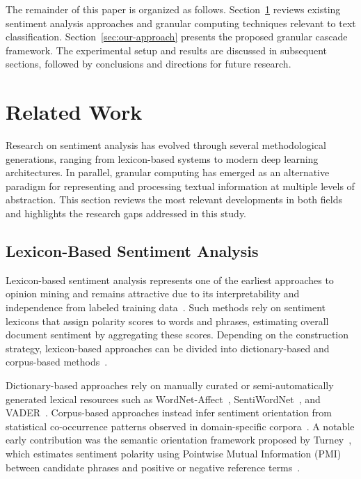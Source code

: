 \documentclass[a4paper,fleqn]{cas-dc}
\begin{document}
The remainder of this paper is organized as follows. Section~\ref{sec:related_work} reviews existing sentiment analysis approaches and granular computing techniques relevant to text classification. Section~\ref{sec:our-approach} presents the proposed granular cascade framework. The experimental setup and results are discussed in subsequent sections, followed by conclusions and directions for future research.


\section{Related Work}
\label{sec:related_work}

Research on sentiment analysis has evolved through several methodological generations, ranging from lexicon-based systems to modern deep learning architectures. In parallel, granular computing has emerged as an alternative paradigm for representing and processing textual information at multiple levels of abstraction. This section reviews the most relevant developments in both fields and highlights the research gaps addressed in this study.

\subsection{Lexicon-Based Sentiment Analysis}

Lexicon-based sentiment analysis represents one of the earliest approaches to opinion mining and remains attractive due to its interpretability and independence from labeled training data~\cite{azzeddine2018sentiment}. Such methods rely on sentiment lexicons that assign polarity scores to words and phrases, estimating overall document sentiment by aggregating these scores. Depending on the construction strategy, lexicon-based approaches can be divided into dictionary-based and corpus-based methods~\cite{azzeddine2018sentiment, ravi2015survey}.

Dictionary-based approaches rely on manually curated or semi-automatically generated lexical resources such as WordNet-Affect~\cite{strapparava2004wordnet}, SentiWordNet~\cite{sentiwordnet2010}, and VADER~\cite{hutto2014vader}. Corpus-based approaches instead infer sentiment orientation from statistical co-occurrence patterns observed in domain-specific corpora~\cite{azzeddine2018sentiment}. A notable early contribution was the semantic orientation framework proposed by Turney~\cite{id:Turney2002Thumbs}, which estimates sentiment polarity using Pointwise Mutual Information (PMI) between candidate phrases and positive or negative reference terms~\cite{azzeddine2018sentiment,behdenna2018document}.
\end{document}
